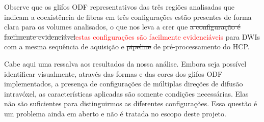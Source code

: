 Observe que os glifos ODF representativos das três regiões analisadas que indicam a coexistência de fibras em três configurações estão presentes de forma clara para os volumes analisados, o que nos leva a crer que \sout{a configuração é facilmente evidenciável}\textcolor{red}{estas configurações são facilmente evidenciáveis} para DWIs com a mesma sequência de aquisição e \sout{pipeline} de pré-processamento do HCP.





Cabe aqui uma ressalva aos resultados da nossa análise. Embora seja possível identificar visualmente, através das formas e das cores dos glifos ODF implementados, a presença de configurações de múltiplas direções de difusão intravóxel, as características aplicadas são somente condições necessárias. Elas não são suficientes para distinguirmos as diferentes configurações. Essa questão é um problema ainda em aberto \cite{SCHILLING2019194} e não é tratada no escopo deste projeto.


